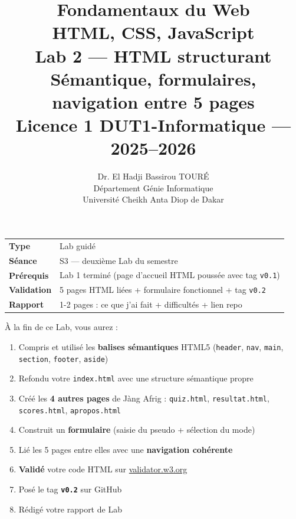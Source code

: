 \documentclass[11pt,a4paper]{article}
\title{%
\vspace{-1cm}
\textbf{\LARGE Fondamentaux du Web}\\
\textbf{\LARGE HTML, CSS, JavaScript}\\[0.8cm]
\textbf{\huge Lab 2 --- HTML structurant}\\[0.3cm]
\textbf{\Large Sémantique, formulaires, navigation entre 5 pages}\\[0.5cm]
\large Licence 1 DUT1-Informatique --- 2025--2026}
\author{Dr. El Hadji Bassirou TOURÉ\\
Département Génie Informatique\\
Université Cheikh Anta Diop de Dakar}
\date{}
\begin{document}
\maketitle
\thispagestyle{empty}

\vspace{0.5cm}

\begin{prereqbox}
\begin{center}
\begin{tabular}{ll}
\toprule
\textbf{Type} & Lab guidé \\
\textbf{Séance} & S3 --- deuxième Lab du semestre \\
\textbf{Prérequis} & Lab 1 terminé (page d'accueil HTML poussée avec tag \texttt{v0.1}) \\
\textbf{Validation} & 5 pages HTML liées + formulaire fonctionnel + tag \texttt{v0.2} \\
\textbf{Rapport} & 1-2 pages : ce que j'ai fait + difficultés + lien repo \\
\bottomrule
\end{tabular}
\end{center}
\end{prereqbox}

\begin{objectifbox}
À la fin de ce Lab, vous aurez :
\begin{enumerate}[nosep]
    \item Compris et utilisé les \textbf{balises sémantiques} HTML5 (\texttt{header}, \texttt{nav}, \texttt{main}, \texttt{section}, \texttt{footer}, \texttt{aside})
    \item Refondu votre \texttt{index.html} avec une structure sémantique propre
    \item Créé les \textbf{4 autres pages} de Jàng Afrig : \texttt{quiz.html}, \texttt{resultat.html}, \texttt{scores.html}, \texttt{apropos.html}
    \item Construit un \textbf{formulaire} (saisie du pseudo + sélection du mode)
    \item Lié les 5 pages entre elles avec une \textbf{navigation cohérente}
    \item \textbf{Validé} votre code HTML sur \href{https://validator.w3.org}{validator.w3.org}
    \item Posé le tag \textbf{\texttt{v0.2}} sur GitHub
    \item Rédigé votre rapport de Lab
\end{enumerate}
\end{objectifbox}
\end{document}
